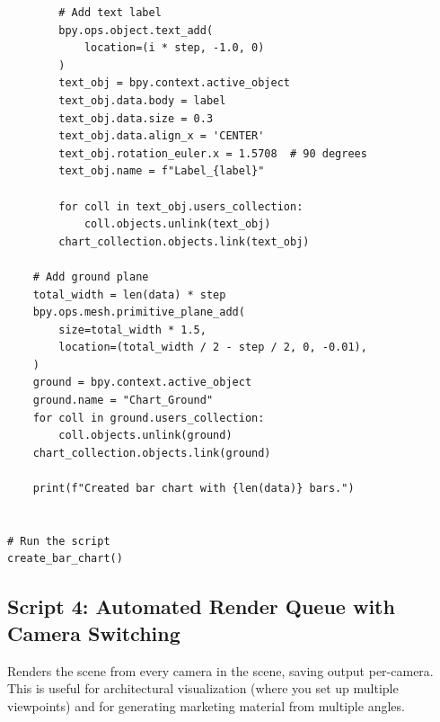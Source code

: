 \begin{lstlisting}
        # Add text label
        bpy.ops.object.text_add(
            location=(i * step, -1.0, 0)
        )
        text_obj = bpy.context.active_object
        text_obj.data.body = label
        text_obj.data.size = 0.3
        text_obj.data.align_x = 'CENTER'
        text_obj.rotation_euler.x = 1.5708  # 90 degrees
        text_obj.name = f"Label_{label}"

        for coll in text_obj.users_collection:
            coll.objects.unlink(text_obj)
        chart_collection.objects.link(text_obj)

    # Add ground plane
    total_width = len(data) * step
    bpy.ops.mesh.primitive_plane_add(
        size=total_width * 1.5,
        location=(total_width / 2 - step / 2, 0, -0.01),
    )
    ground = bpy.context.active_object
    ground.name = "Chart_Ground"
    for coll in ground.users_collection:
        coll.objects.unlink(ground)
    chart_collection.objects.link(ground)

    print(f"Created bar chart with {len(data)} bars.")


# Run the script
create_bar_chart()
\end{lstlisting}

\subsection{Script 4: Automated Render Queue with Camera Switching}

Renders the scene from every camera in the scene, saving output per-camera. This is useful for architectural visualization (where you set up multiple viewpoints) and for generating marketing material from multiple angles.

